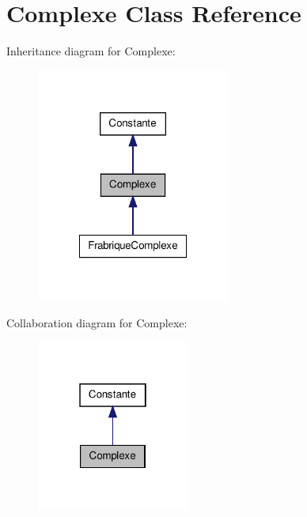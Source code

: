 \hypertarget{class_complexe}{\section{\-Complexe \-Class \-Reference}
\label{class_complexe}
}


\-Inheritance diagram for \-Complexe\-:
\nopagebreak
\begin{figure}[H]
\begin{center}
\leavevmode
\includegraphics[width=180pt]{class_complexe__inherit__graph}
\end{center}
\end{figure}


\-Collaboration diagram for \-Complexe\-:
\nopagebreak
\begin{figure}[H]
\begin{center}
\leavevmode
\includegraphics[width=142pt]{class_complexe__coll__graph}
\end{center}
\end{figure}
